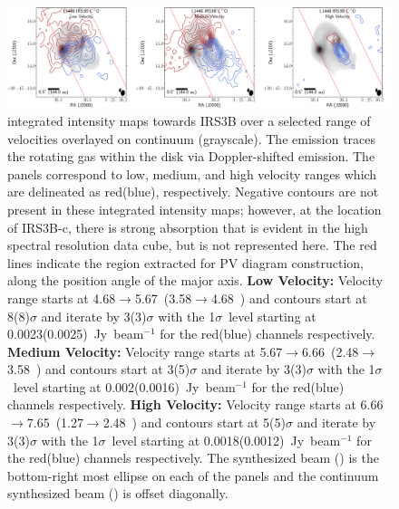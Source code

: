 \begin{figure}[H]
\begin{center}
   \includegraphics[width=1\textwidth]{img/L1448IRS3B_C17O_image_taper1500k__splitMoments_panel.pdf}  %
\end{center}
   \caption{\cso\space integrated intensity maps towards IRS3B over a selected range of velocities overlayed on continuum (grayscale). The \cso\space emission traces the rotating gas within the disk via Doppler-shifted emission. The panels correspond to low, medium, and high velocity ranges which are delineated as red(blue), respectively. Negative contours are not present in these integrated intensity maps; however, at the location of IRS3B-c, there is strong absorption that is evident in the high spectral resolution data cube, but is not represented here. The red lines indicate the region extracted for PV diagram construction, along the position angle of the major axis. \textbf{Low Velocity:} Velocity range starts at 4.68$\rightarrow$5.67~\kms (3.58$\rightarrow$4.68~\kms) and contours start at 8(8)$\sigma$ and iterate by 3(3)$\sigma$ with the 1$\sigma$~level starting at 0.0023(0.0025)~Jy~beam$^{-1}$ for the red(blue) channels respectively. \textbf{Medium Velocity:} Velocity range starts at 5.67$\rightarrow$6.66~\kms (2.48$\rightarrow$3.58~\kms) and contours start at 3(5)$\sigma$ and iterate by 3(3)$\sigma$ with the 1$\sigma$~level starting at 0.002(0.0016)~Jy~beam$^{-1}$ for the red(blue) channels respectively. \textbf{High Velocity:} Velocity range starts at 6.66$\rightarrow$7.65~\kms (1.27$\rightarrow$2.48~\kms) and contours start at 5(5)$\sigma$ and iterate by 3(3)$\sigma$ with the 1$\sigma$~level starting at 0.0018(0.0012)~Jy~beam$^{-1}$ for the red(blue) channels respectively. The \cso\space synthesized beam (\csobeam) is the bottom-right most ellipse on each of the panels and the continuum synthesized beam (\contbeam) is offset diagonally.}\label{fig:irs3bc17omoment}
\end{figure}





